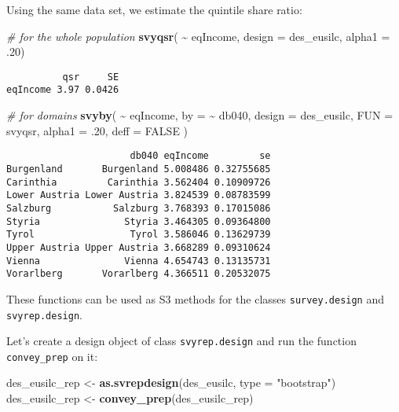 \documentclass[
]{book}
\newenvironment{Shaded}{\begin{snugshade}}{\end{snugshade}}
\newcommand{\AttributeTok}[1]{\textcolor[rgb]{0.13,0.29,0.53}{#1}}
\newcommand{\CommentTok}[1]{\textcolor[rgb]{0.56,0.35,0.01}{\textit{#1}}}
\newcommand{\ConstantTok}[1]{\textcolor[rgb]{0.56,0.35,0.01}{#1}}
\newcommand{\DecValTok}[1]{\textcolor[rgb]{0.00,0.00,0.81}{#1}}
\newcommand{\FunctionTok}[1]{\textcolor[rgb]{0.13,0.29,0.53}{\textbf{#1}}}
\newcommand{\NormalTok}[1]{#1}
\newcommand{\OtherTok}[1]{\textcolor[rgb]{0.56,0.35,0.01}{#1}}
\newcommand{\SpecialCharTok}[1]{\textcolor[rgb]{0.81,0.36,0.00}{\textbf{#1}}}
\newcommand{\StringTok}[1]{\textcolor[rgb]{0.31,0.60,0.02}{#1}}
\begin{document}
Using the same data set, we estimate the quintile share ratio:

\begin{Shaded}
\begin{Highlighting}[]
\CommentTok{\# for the whole population}
\FunctionTok{svyqsr}\NormalTok{( }\SpecialCharTok{\textasciitilde{}}\NormalTok{ eqIncome, }\AttributeTok{design =}\NormalTok{ des\_eusilc, }\AttributeTok{alpha1 =}\NormalTok{ .}\DecValTok{20}\NormalTok{)}
\end{Highlighting}
\end{Shaded}

\begin{verbatim}
          qsr     SE
eqIncome 3.97 0.0426
\end{verbatim}

\begin{Shaded}
\begin{Highlighting}[]
\CommentTok{\# for domains}
\FunctionTok{svyby}\NormalTok{(}
  \SpecialCharTok{\textasciitilde{}}\NormalTok{ eqIncome,}
  \AttributeTok{by =} \SpecialCharTok{\textasciitilde{}}\NormalTok{ db040,}
  \AttributeTok{design =}\NormalTok{ des\_eusilc,}
  \AttributeTok{FUN =}\NormalTok{ svyqsr,}
  \AttributeTok{alpha1 =}\NormalTok{ .}\DecValTok{20}\NormalTok{,}
  \AttributeTok{deff =} \ConstantTok{FALSE}
\NormalTok{)}
\end{Highlighting}
\end{Shaded}

\begin{verbatim}
                      db040 eqIncome         se
Burgenland       Burgenland 5.008486 0.32755685
Carinthia         Carinthia 3.562404 0.10909726
Lower Austria Lower Austria 3.824539 0.08783599
Salzburg           Salzburg 3.768393 0.17015086
Styria               Styria 3.464305 0.09364800
Tyrol                 Tyrol 3.586046 0.13629739
Upper Austria Upper Austria 3.668289 0.09310624
Vienna               Vienna 4.654743 0.13135731
Vorarlberg       Vorarlberg 4.366511 0.20532075
\end{verbatim}

These functions can be used as S3 methods for the classes \texttt{survey.design} and \texttt{svyrep.design}.

Let's create a design object of class \texttt{svyrep.design} and run the function \texttt{convey\_prep} on it:

\begin{Shaded}
\begin{Highlighting}[]
\NormalTok{des\_eusilc\_rep }\OtherTok{\textless{}{-}} \FunctionTok{as.svrepdesign}\NormalTok{(des\_eusilc, }\AttributeTok{type =} \StringTok{"bootstrap"}\NormalTok{)}
\NormalTok{des\_eusilc\_rep }\OtherTok{\textless{}{-}} \FunctionTok{convey\_prep}\NormalTok{(des\_eusilc\_rep)}
\end{Highlighting}
\end{Shaded}
\end{document}
